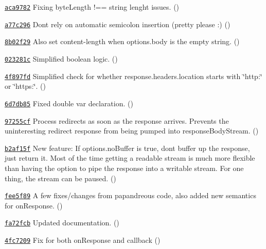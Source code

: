 \begin{DoxyItemize}
\item \href{https://github.com/mikeal/request/commit/aca9782285fe1d727570fe8d799561f45d49048e}{\tt aca9782} Fixing byte\+Length !== string lenght issues. ()
\item \href{https://github.com/mikeal/request/commit/a77c296431eda2a211f59bdb88654c4a64ed4ef3}{\tt a77c296} Don\textquotesingle{}t rely on automatic semicolon insertion (pretty please \+:) ()
\item \href{https://github.com/mikeal/request/commit/8b02f29c9019dd1d1dd291dd85889b26f592a137}{\tt 8b02f29} Also set content-\/length when options.\+body is the empty string. ()
\item \href{https://github.com/mikeal/request/commit/023281ca9b4414a9bc0170c2b08aaf886a7a08f7}{\tt 023281c} Simplified boolean logic. ()
\item \href{https://github.com/mikeal/request/commit/4f897fdd6c7c93bea73dbf34623f09af63bb1ed4}{\tt 4f897fd} Simplified check for whether response.\+headers.\+location starts with \char`\"{}http\+:\char`\"{} or \char`\"{}https\+:\char`\"{}. ()
\item \href{https://github.com/mikeal/request/commit/6d7db85cadf401dffdec07a4d66822207898c69e}{\tt 6d7db85} Fixed double var declaration. ()
\item \href{https://github.com/mikeal/request/commit/97255cfd2a4aa8f34d307e7cd96fe1c1f13cb26a}{\tt 97255cf} Process redirects as soon as the response arrives. Prevents the uninteresting redirect response from being pumped into response\+Body\+Stream. ()
\item \href{https://github.com/mikeal/request/commit/b2af15f4fcbe1115cf8b53c5ae89fbf2365bfffc}{\tt b2af15f} New feature\+: If options.\+no\+Buffer is true, don\textquotesingle{}t buffer up the response, just return it. Most of the time getting a readable stream is much more flexible than having the option to pipe the response into a writable stream. For one thing, the stream can be paused. ()
\item \href{https://github.com/mikeal/request/commit/fee5f89159a8f36b25df509c55093bf7ebd1c993}{\tt fee5f89} A few fixes/changes from papandreou\textquotesingle{}s code, also added new semantics for on\+Response. ()
\item \href{https://github.com/mikeal/request/commit/fa72fcb950029b222f0621e2d49304e35d08c380}{\tt fa72fcb} Updated documentation. ()
\item \href{https://github.com/mikeal/request/commit/4fc72098e7eeb9518951b9306115340ffdcce7ce}{\tt 4fc7209} Fix for both on\+Response and callback ()

\end{DoxyItemize}
